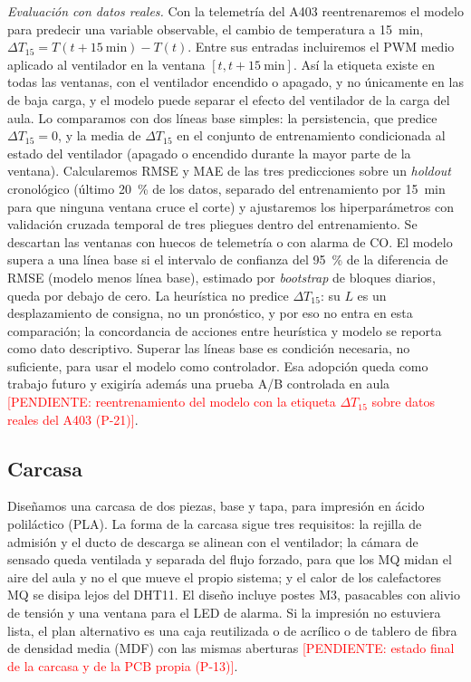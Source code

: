 \documentclass[manuscript,screen,nonacm,natbib=false]{acmart}
\newcommand{\pendiente}[1]{\textcolor{red}{[PENDIENTE: #1]}}
\begin{document}
\textit{Evaluación con datos reales.} Con la telemetría del A403 reentrenaremos el modelo para predecir una variable observable, el cambio de temperatura a 15~min, $\Delta T_{15} = T(t+15~\mathrm{min}) - T(t)$. Entre sus entradas incluiremos el PWM medio aplicado al ventilador en la ventana $[t, t+15~\mathrm{min}]$. Así la etiqueta existe en todas las ventanas, con el ventilador encendido o apagado, y no únicamente en las de baja carga, y el modelo puede separar el efecto del ventilador de la carga del aula. Lo comparamos con dos líneas base simples: la persistencia, que predice $\Delta T_{15} = 0$, y la media de $\Delta T_{15}$ en el conjunto de entrenamiento condicionada al estado del ventilador (apagado o encendido durante la mayor parte de la ventana). Calcularemos RMSE y MAE de las tres predicciones sobre un \textit{holdout} cronológico (último 20~\% de los datos, separado del entrenamiento por 15~min para que ninguna ventana cruce el corte) y ajustaremos los hiperparámetros con validación cruzada temporal de tres pliegues dentro del entrenamiento. Se descartan las ventanas con huecos de telemetría o con alarma de CO. El modelo supera a una línea base si el intervalo de confianza del 95~\% de la diferencia de RMSE (modelo menos línea base), estimado por \textit{bootstrap} de bloques diarios, queda por debajo de cero. La heurística no predice $\Delta T_{15}$: su $L$ es un desplazamiento de consigna, no un pronóstico, y por eso no entra en esta comparación; la concordancia de acciones entre heurística y modelo se reporta como dato descriptivo. Superar las líneas base es condición necesaria, no suficiente, para usar el modelo como controlador. Esa adopción queda como trabajo futuro y exigiría además una prueba A/B controlada en aula \pendiente{reentrenamiento del modelo con la etiqueta $\Delta T_{15}$ sobre datos reales del A403 (P-21)}.

\subsection{Carcasa}
Diseñamos una carcasa de dos piezas, base y tapa, para impresión en ácido poliláctico (PLA). La forma de la carcasa sigue tres requisitos: la rejilla de admisión y el ducto de descarga se alinean con el ventilador; la cámara de sensado queda ventilada y separada del flujo forzado, para que los MQ midan el aire del aula y no el que mueve el propio sistema; y el calor de los calefactores MQ se disipa lejos del DHT11. El diseño incluye postes M3, pasacables con alivio de tensión y una ventana para el LED de alarma. Si la impresión no estuviera lista, el plan alternativo es una caja reutilizada o de acrílico o de tablero de fibra de densidad media (MDF) con las mismas aberturas \pendiente{estado final de la carcasa y de la PCB propia (P-13)}.
\end{document}
